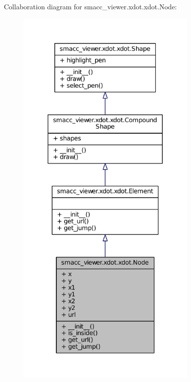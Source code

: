 Collaboration diagram for smacc\+\_\+viewer.\+xdot.\+xdot.\+Node\+:
\nopagebreak
\begin{figure}[H]
\begin{center}
\leavevmode
\includegraphics[height=550pt]{classsmacc__viewer_1_1xdot_1_1xdot_1_1Node__coll__graph}
\end{center}
\end{figure}

